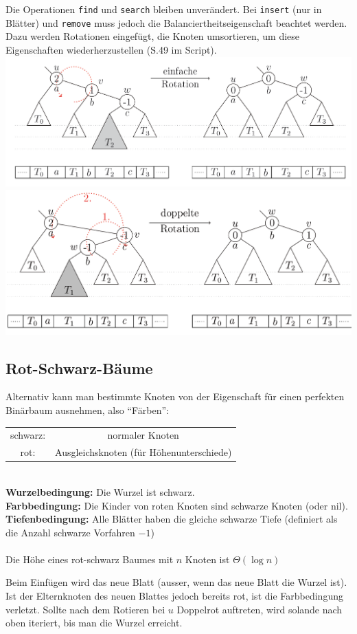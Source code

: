 \documentclass{scrartcl}
\begin{document}
Die Operationen \texttt{find} und \texttt{search} bleiben unverändert. Bei \texttt{insert} (nur in Blätter) und \texttt{remove} muss jedoch die Balanciertheitseigenschaft beachtet werden. Dazu werden Rotationen eingefügt, die Knoten umsortieren, um diese Eigenschaften wiederherzustellen (S.49 im Script). \\
\includegraphics[width=\textwidth]{images/AVL-einfacheRotation.png} \\
\includegraphics[width=\textwidth]{images/AVL-doppelteRotation.png}

\subsection{Rot-Schwarz-Bäume}
Alternativ kann man bestimmte Knoten von der Eigenschaft für einen perfekten Binärbaum ausnehmen, also "`Färben"':

\begin{shaded}
\begin{tabular}{cc}
schwarz: & normaler Knoten \\ 
rot: & Ausgleichsknoten (für Höhenunterschiede) \\ 
\end{tabular}\\
\textbf{Wurzelbedingung:} Die Wurzel ist schwarz. \\
\textbf{Farbbedingung:} Die Kinder von roten Knoten sind schwarze Knoten (oder nil). \\
\textbf{Tiefenbedingung:} Alle Blätter haben die gleiche schwarze Tiefe (definiert als die Anzahl schwarze Vorfahren $-1$) \\ \ \\
Die Höhe eines rot-schwarz Baumes mit $n$ Knoten ist $\Theta(\log n)$
\end{shaded}
Beim Einfügen wird das neue Blatt  (ausser, wenn das neue Blatt die Wurzel ist). Ist der Elternknoten des neuen Blattes jedoch bereits rot, ist die Farbbedingung verletzt. Sollte nach dem Rotieren bei $u$ Doppelrot auftreten, wird solande nach oben iteriert, bis man die Wurzel erreicht.\\
\end{document}
